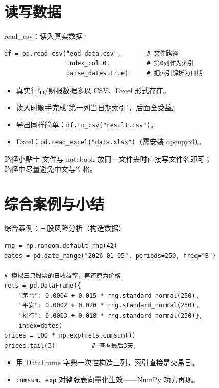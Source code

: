 \documentclass[9pt]{ctexbeamer}
\begin{document}
\section{读写数据}

\begin{frame}[fragile]{read\_csv：读入真实数据}
	\begin{lstlisting}
df = pd.read_csv("eod_data.csv",       # 文件路径
                 index_col=0,          # 第0列作为索引
                 parse_dates=True)     # 把索引解析为日期
\end{lstlisting}
	\begin{itemize}
		\item 真实行情/财报数据多以 CSV、Excel 形式存在。
		\item 读入时顺手完成"第一列当日期索引"，后面全受益。
		\item 导出同样简单：\texttt{df.to\_csv("result.csv")}。
		\item Excel：\texttt{pd.read\_excel("data.xlsx")}（需安装 openpyxl）。
	\end{itemize}
	\begin{alertblock}{路径小贴士}
		文件与 notebook 放同一文件夹时直接写文件名即可；\\
		路径中尽量避免中文与空格。
	\end{alertblock}
\end{frame}


\section{综合案例与小结}

\begin{frame}[fragile]{综合案例：三股风险分析（构造数据）}
	\begin{lstlisting}
rng = np.random.default_rng(42)
dates = pd.date_range("2026-01-05", periods=250, freq="B")

# 模拟三只股票的日收益率，再还原为价格
rets = pd.DataFrame({
    "茅台": 0.0004 + 0.015 * rng.standard_normal(250),
    "平安": 0.0002 + 0.020 * rng.standard_normal(250),
    "招行": 0.0003 + 0.018 * rng.standard_normal(250)},
    index=dates)
prices = 100 * np.exp(rets.cumsum())
prices.tail(3)          # 查看最后3天
\end{lstlisting}
	\begin{itemize}
		\item 用 DataFrame 字典一次性构造三列，索引直接是交易日。
		\item \texttt{cumsum}、\texttt{exp} 对整张表向量化生效——NumPy 功力再现。
	\end{itemize}
\end{frame}
\end{document}
